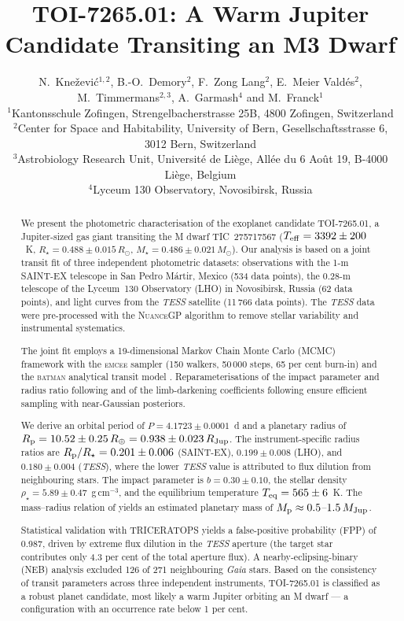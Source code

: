 \documentclass[fleqn,usenatbib]{mnras}
\title[TOI-7265.01: A Warm Jupiter Candidate]{TOI-7265.01: A Warm Jupiter Candidate Transiting an M3 Dwarf}
\author[N. Knežević et al.]{%
  N.~Knežević$^{1,2}$,
  B.-O.~Demory$^{2}$,
  F.~Zong Lang$^{2}$,
  E.~Meier Valdés$^{2}$,
  M.~Timmermans$^{2,3}$,
  A.~Garmash$^{4}$
  and M.~Franck$^{1}$
  \\
  $^{1}$Kantonsschule Zofingen, Strengelbacherstrasse 25B, 4800 Zofingen, Switzerland\\
  $^{2}$Center for Space and Habitability, University of Bern, Gesellschaftsstrasse 6, 3012 Bern, Switzerland\\
  $^{3}$Astrobiology Research Unit, Université de Liège, Allée du 6 Août 19, B-4000 Liège, Belgium\\
  $^{4}$Lyceum 130 Observatory, Novosibirsk, Russia
}
\newcommand{\Msun}{M_{\odot}}
\newcommand{\Rsun}{R_{\odot}}
\newcommand{\Mjup}{M_{\rm Jup}}
\newcommand{\Rjup}{R_{\rm Jup}}
\newcommand{\Rearth}{R_{\oplus}}
\newcommand{\Teff}{T_{\rm eff}}
\newcommand{\Teq}{T_{\rm eq}}
\newcommand{\rhostar}{\rho_{\star}}
\newcommand{\rprs}{R_{\rm p}/R_{\star}}
\newcommand{\SAINTEX}{SAINT-EX}
\newcommand{\nuance}{\textsc{NuanceGP}}
\newcommand{\batman}{\textsc{batman}}
\newcommand{\emcee}{\textsc{emcee}}
\newcommand{\triceratops}{\textsc{TRICERATOPS}}
\begin{document}
\label{firstpage}
\pagerange{\pageref{firstpage}--\pageref{lastpage}}
\maketitle

\begin{abstract}
We present the photometric characterisation of the exoplanet candidate TOI-7265.01, a Jupiter-sized gas giant transiting the M dwarf TIC~275717567 ($\Teff = 3392 \pm 200$~K, $R_{\star} = 0.488 \pm 0.015\,\Rsun$, $M_{\star} = 0.486 \pm 0.021\,\Msun$). Our analysis is based on a joint transit fit of three independent photometric datasets: observations with the 1-m \SAINTEX{} telescope in San Pedro Mártir, Mexico (534 data points), the 0.28-m telescope of the Lyceum~130 Observatory (LHO) in Novosibirsk, Russia (62 data points), and light curves from the \textit{TESS} satellite (11\,766 data points). The \textit{TESS} data were pre-processed with the \nuance{} algorithm to remove stellar variability and instrumental systematics.

The joint fit employs a 19-dimensional Markov Chain Monte Carlo (MCMC) framework with the \emcee{} sampler \citep{foremanmackey2013} (150 walkers, 50\,000 steps, 65 per cent burn-in) and the \batman{} analytical transit model \citep{kreidberg2015}. Reparameterisations of the impact parameter and radius ratio following \citet{espinoza2018} and of the limb-darkening coefficients following \citet{kipping2013} ensure efficient sampling with near-Gaussian posteriors.

We derive an orbital period of $P = 4.1723 \pm 0.0001$~d and a planetary radius of $R_{\rm p} = 10.52 \pm 0.25\,\Rearth = 0.938 \pm 0.023\,\Rjup$. The instrument-specific radius ratios are $\rprs = 0.201 \pm 0.006$ (\SAINTEX{}), $0.199 \pm 0.008$ (LHO), and $0.180 \pm 0.004$ (\textit{TESS}), where the lower \textit{TESS} value is attributed to flux dilution from neighbouring stars. The impact parameter is $b = 0.30 \pm 0.10$, the stellar density $\rhostar = 5.89 \pm 0.47$~g\,cm$^{-3}$, and the equilibrium temperature $\Teq = 565 \pm 6$~K. The mass--radius relation of \citet{chenkipping2017} yields an estimated planetary mass of $M_{\rm p} \approx 0.5$--$1.5\,\Mjup$.

Statistical validation with \triceratops{} \citep{giacalone2021} yields a false-positive probability (FPP) of 0.987, driven by extreme flux dilution in the \textit{TESS} aperture (the target star contributes only 4.3 per cent of the total aperture flux). A nearby-eclipsing-binary (NEB) analysis excluded 126 of 271 neighbouring \textit{Gaia} stars. Based on the consistency of transit parameters across three independent instruments, TOI-7265.01 is classified as a robust planet candidate, most likely a warm Jupiter orbiting an M dwarf — a configuration with an occurrence rate below 1 per cent.
\end{abstract}
\end{document}
